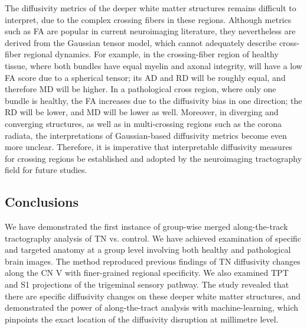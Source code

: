 The diffusivity metrics of the deeper white matter structures remains difficult to interpret, due to the complex crossing fibers in these regions. Although metrics such as FA are popular in current neuroimaging literature, they nevertheless are derived from the Gaussian tensor model, which cannot adequately describe cross-fiber regional dynamics. For example, in the crossing-fiber region of healthy tissue, where both bundles have equal myelin and axonal integrity, will have a low FA score due to a spherical tensor; its AD and RD will be roughly equal, and therefore MD will be higher. In a pathological cross region, where only one bundle is healthy, the FA increases due to the diffusivity bias in one direction; the RD will be lower, and MD will be lower as well. Moreover, in diverging and converging structures, as well as in multi-crossing regions such as the corona radiata, the interpretations of Gaussian-based diffusivity metrics become even more unclear. Therefore, it is imperative that interpretable diffusivity measures for crossing regions be established and adopted by the neuroimaging tractography field for future studies. 

\subsection{Conclusions}
We have demonstrated the first instance of group-wise merged along-the-track tractography analysis of TN vs. control. We have achieved examination of specific and targeted anatomy at a group level involving both healthy and pathological brain images. The method reproduced previous findings of TN diffusivity changes along the CN V with finer-grained regional specificity. We also examined TPT and S1 projections of the trigeminal sensory pathway. The study revealed that there are specific diffusivity changes on these deeper white matter structures, and demonstrated the power of along-the-tract analysis with machine-learning, which pinpoints the exact location of the diffusivity disruption at millimetre level. 
